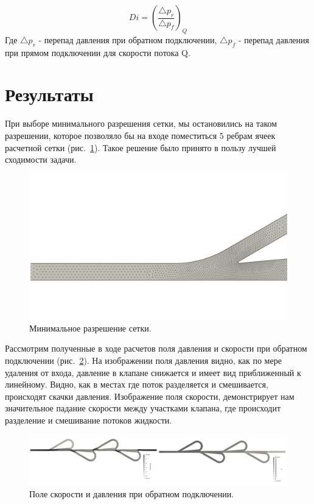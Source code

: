\documentclass[10pt,a4paper]{book}
\begin{document}
    \begin{equation}\label{eqn:Di}
        Di = (\frac{\bigtriangleup p_{r}}{\bigtriangleup p_{f}})_Q
    \end{equation}
    Где $\bigtriangleup p_{r}$ - перепад давления при обратном подключении, $\bigtriangleup p_{f}$ - перепад давления при прямом подключении для скорости потока Q.
    
    \section{Результаты}
    
    При выборе минимального разрешения сетки, мы остановились на таком разрешении, которое позволяло бы на входе поместиться 5 ребрам ячеек расчетной сетки (рис.~\ref{fig:minMesh}). Такое решение было принято в пользу лучшей сходимости задачи.
    
    \begin{figure}[H]
        \centering
        \includegraphics[width = 1\linewidth]{minMesh}
        \caption{Минимальное разрешение сетки.}
        \label{fig:minMesh}
    \end{figure}
    
    Рассмотрим полученные в ходе расчетов поля давления и скорости при обратном подключении (рис.~\ref{fig:UPFieldsReverse}). На изображении поля давления видно, как по мере удаления от входа, давление в клапане снижается и имеет вид приближенный к линейному. Видно, как в местах где поток разделяется и смешивается, происходят скачки давления. Изображение поля скорости, демонстрирует нам значительное падание скорости между участками клапана, где происходит разделение и смешивание потоков жидкости.
    
    \begin{figure}[H]
        \centering
        \includegraphics[width = 1\linewidth]{UPFieldsReverse}
        \caption{Поле скорости и давления при обратном подключении.}
        \label{fig:UPFieldsReverse}
    \end{figure}
    
\end{document}
